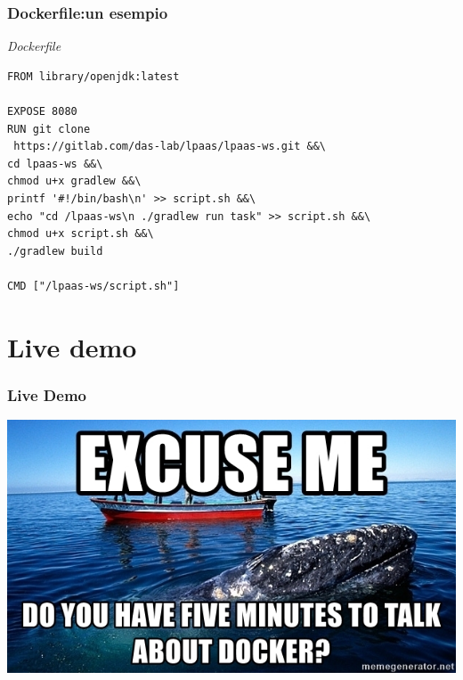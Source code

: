 \documentclass{beamer}
\begin{document}
\begin{frame}[fragile] %
\frametitle{Dockerfile:un esempio}
\begin{block}{\textit{Dockerfile}}
\begin{verbatim}
FROM library/openjdk:latest

EXPOSE 8080
RUN git clone
 https://gitlab.com/das-lab/lpaas/lpaas-ws.git &&\
cd lpaas-ws &&\
chmod u+x gradlew &&\
printf '#!/bin/bash\n' >> script.sh &&\
echo "cd /lpaas-ws\n ./gradlew run task" >> script.sh &&\
chmod u+x script.sh &&\
./gradlew build

CMD ["/lpaas-ws/script.sh"]
\end{verbatim}
\end{block}
\end{frame}

\section{Live demo}
\begin{frame}
\frametitle{Live Demo}
\includegraphics[width=\textwidth]{normies}
\end{frame}
\end{document}
